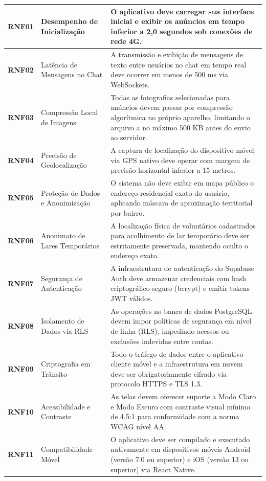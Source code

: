 {\begin{longtable}{|>{\centering\arraybackslash}p{1.4cm}|>{\raggedright\arraybackslash}p{3.8cm}|>{\raggedright\arraybackslash}p{9.2cm}|}
\textbf{RNF01} & Desempenho de Inicialização & O aplicativo deve carregar sua interface inicial e exibir os anúncios em tempo inferior a 2,0 segundos sob conexões de rede 4G. \\ \hline
\textbf{RNF02} & Latência de Mensagens no Chat & A transmissão e exibição de mensagens de texto entre usuários no chat em tempo real deve ocorrer em menos de 500 ms via WebSockets. \\ \hline
\textbf{RNF03} & Compressão Local de Imagens & Todas as fotografias selecionadas para anúncios devem passar por compressão algorítmica no próprio aparelho, limitando o arquivo a no máximo 500 KB antes do envio ao servidor. \\ \hline
\textbf{RNF04} & Precisão de Geolocalização & A captura de localização do dispositivo móvel via GPS nativo deve operar com margem de precisão horizontal inferior a 15 metros. \\ \hline
\textbf{RNF05} & Proteção de Dados e Anonimização & O sistema não deve exibir em mapa público o endereço residencial exato do usuário, aplicando máscara de aproximação territorial por bairro. \\ \hline
\textbf{RNF06} & Anonimato de Lares Temporários & A localização física de voluntários cadastrados para acolhimento de lar temporário deve ser estritamente preservada, mantendo oculto o endereço exato. \\ \hline
\textbf{RNF07} & Segurança de Autenticação & A infraestrutura de autenticação do Supabase Auth deve armazenar credenciais com hash criptográfico seguro (bcrypt) e emitir tokens JWT válidos. \\ \hline
\textbf{RNF08} & Isolamento de Dados via RLS & As operações no banco de dados PostgreSQL devem impor políticas de segurança em nível de linha (RLS), impedindo acessos ou exclusões indevidas entre contas. \\ \hline
\textbf{RNF09} & Criptografia em Trânsito & Todo o tráfego de dados entre o aplicativo cliente móvel e a infraestrutura em nuvem deve ser obrigatoriamente cifrado via protocolo HTTPS e TLS 1.3. \\ \hline
\textbf{RNF10} & Acessibilidade e Contraste & As telas devem oferecer suporte a Modo Claro e Modo Escuro com contraste visual mínimo de 4.5:1 para conformidade com a norma WCAG nível AA. \\ \hline
\textbf{RNF11} & Compatibilidade Móvel & O aplicativo deve ser compilado e executado nativamente em dispositivos móveis Android (versão 7.0 ou superior) e iOS (versão 13 ou superior) via React Native. \\ \hline

\end{longtable}}
